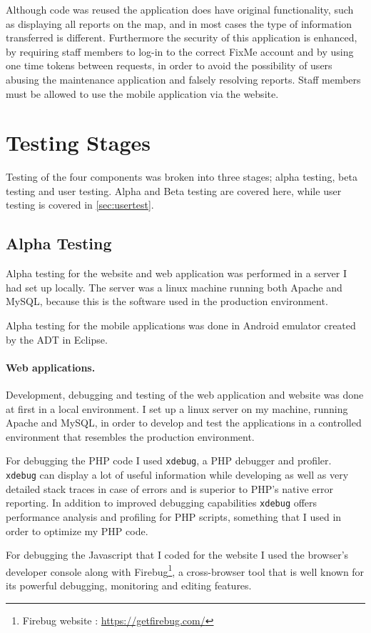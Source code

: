 \documentclass[12pt]{ecsproject}     %
\begin{document}
Although code was reused the application does have original functionality, such as displaying all reports on the map, and in most cases the type of information transferred is different. Furthermore the security of this application is enhanced, by requiring staff members to log-in to the correct FixMe account and by using one time tokens between requests, in order to avoid the possibility of users abusing the maintenance application and falsely resolving reports. Staff members must be allowed to use the mobile application via the website.

\section{Testing Stages}
Testing of the four components was broken into three stages; alpha testing, beta testing and user testing. Alpha and Beta testing are covered here, while user testing is covered in \ref{sec:usertest}.
\subsection{Alpha Testing}
Alpha testing for the website and web application was performed in a server I had set up locally. The server was a linux machine running both Apache and MySQL, because this is the software used in the production environment.

Alpha testing for the mobile applications was done in Android emulator created by the ADT in Eclipse.

\paragraph{Web applications.}
Development, debugging and testing of the web application and website was done at first in a local environment. I set up a linux server on my machine, running Apache and MySQL, in order to develop and test the applications in a controlled environment that resembles the production environment. 

For debugging the PHP code I used \texttt{xdebug}, a PHP debugger and profiler. \texttt{xdebug} can display a lot of useful information while developing as well as very detailed stack traces in case of errors and is superior to PHP's native error reporting. In addition to improved debugging capabilities \texttt{xdebug} offers performance analysis and profiling for PHP scripts, something that I used in order to optimize my PHP code.

For debugging the Javascript that I coded for the website I used the browser's developer console along with Firebug\footnote{Firebug website : \href{https://getfirebug.com/}{https://getfirebug.com/}}, a cross-browser tool that is well known for its powerful debugging, monitoring and editing features.
\end{document}
